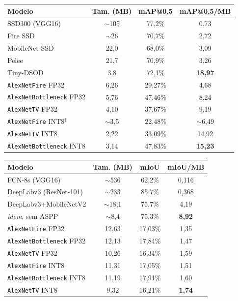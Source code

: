 \documentclass[conference]{IEEEtran}
\begin{document}
\begin{table}[!t]
\begin{minipage}[t]{0.49\textwidth}
\centering
\footnotesize
\setlength{\tabcolsep}{4pt}
\begin{tabular}{@{}lccc@{}}
\toprule
\textbf{Modelo} & \textbf{Tam. (MB)} & \textbf{mAP@0,5} & \textbf{mAP@0,5/MB} \\
\midrule
SSD300 (VGG16) \cite{liu2016ssd} & $\sim$105 & 77,2\% & 0,73 \\
Fire SSD \cite{liau2018firessd} & $\sim$26 & 70,7\% & 2,72 \\
MobileNet-SSD \cite{wang2018pelee,li2018tinydsod} & 22,0 & 68,0\% & 3,09 \\
Pelee \cite{wang2018pelee} & 21,7 & 70,9\% & 3,26 \\
Tiny-DSOD \cite{li2018tinydsod} & 3,8 & 72,1\% & \textbf{18,97} \\
\midrule
\texttt{AlexNetFire} FP32 & 6,26 & 29,27\% & 4,68 \\
\texttt{AlexNetBottleneck} FP32 & 5,76 & 47,46\% & 8,24 \\
\texttt{AlexNetTV} FP32 & 4,10 & 37,67\% & 9,19 \\
\texttt{AlexNetFire} INT8$^{\dagger}$ & $\sim$3,5 & 22,48\% & $\sim$6,49 \\
\texttt{AlexNetTV} INT8 & 2,22 & 33,09\% & 14,92 \\
\texttt{AlexNetBottleneck} INT8 & 3,14 & 47,83\% & \textbf{15,23} \\
\bottomrule
\end{tabular}
\end{minipage}\hfill
\begin{minipage}[t]{0.49\textwidth}
\centering
\footnotesize
\setlength{\tabcolsep}{4pt}
\begin{tabular}{@{}lccc@{}}
\toprule
\textbf{Modelo} & \textbf{Tam. (MB)} & \textbf{mIoU} & \textbf{mIoU/MB} \\
\midrule
FCN-8s (VGG16) \cite{long2015fcn} & $\sim$536 & 62,2\% & 0,116 \\
DeepLabv3 (ResNet-101) \cite{chen2017rethinking} & $\sim$233 & 85,7\% & 0,368 \\
DeepLabv3+MobileNetV2 \cite{sandler2018mobilenetv2} & $\sim$18,1 & 75,7\% & 4,19 \\
\quad \textit{idem}, sem ASPP & $\sim$8,4 & 75,3\% & \textbf{8,92} \\
\midrule
\texttt{AlexNetFire} FP32 & 12,63 & 17,03\% & 1,35 \\
\texttt{AlexNetBottleneck} FP32 & 12,13 & 17,84\% & 1,47 \\
\texttt{AlexNetTV} FP32 & 10,26 & 16,34\% & 1,59 \\
\texttt{AlexNetFire} INT8 & 11,31 & 17,05\% & 1,51 \\
\texttt{AlexNetBottleneck} INT8 & 11,19 & 17,91\% & 1,60 \\
\texttt{AlexNetTV} INT8 & 9,32 & 16,21\% & \textbf{1,74} \\
\bottomrule
\end{tabular}
\end{minipage}
\end{table}
\end{document}
